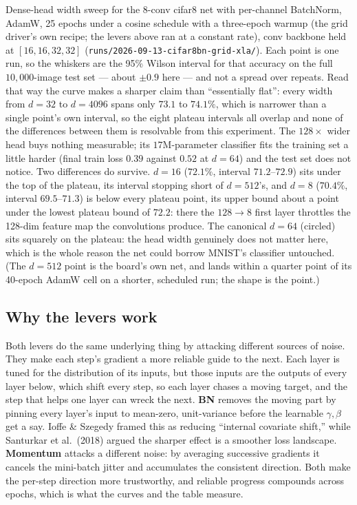 \noindent Dense-head width sweep for the 8-conv cifar8 net with per-channel
BatchNorm, AdamW, 25 epochs under a cosine schedule with a three-epoch
warmup (the grid driver's own recipe; the levers above ran at a constant
rate), conv backbone held at $[16,16,32,32]$
(\texttt{runs/2026-09-13-cifar8bn-grid-xla/}). Each point is one run, so
the whiskers are the 95\% Wilson interval for that accuracy on the full
$10{,}000$-image test set --- about $\pm 0.9$ here --- and not a spread
over repeats. Read that way the curve makes a sharper claim than
``essentially flat'': every width from $d{=}32$ to $d{=}4096$ spans only
$73.1$ to $74.1\%$, which is narrower than a single point's own interval,
so the eight plateau intervals all overlap and none of the
differences between them is resolvable from this experiment. The
$128\times$ wider head buys nothing measurable; its $17$M-parameter
classifier fits the training set a little harder (final train loss $0.39$
against $0.52$ at $d{=}64$) and the test set does not notice. Two
differences do survive. $d{=}16$ ($72.1\%$, interval $71.2$--$72.9$) sits
under the top of the plateau, its interval stopping short of $d{=}512$'s,
and $d{=}8$ ($70.4\%$, interval $69.5$--$71.3$) is below every plateau
point, its upper bound about a point under the lowest plateau bound of
$72.2$: there the $128{\to}8$ first layer throttles the 128-dim feature
map the convolutions produce. The canonical $d{=}64$ (circled) sits
squarely on the plateau: the head width genuinely does not matter here,
which is the whole reason the net could borrow MNIST's classifier
untouched. (The $d{=}512$ point is the board's own net, and lands within a
quarter point of its 40-epoch AdamW cell on a shorter, scheduled run; the
shape is the point.)

\subsection*{Why the levers work}

Both levers do the same underlying thing by attacking different sources
of noise. They make each step's gradient a more reliable guide to the
next. Each layer is tuned for the distribution of its
inputs, but those inputs are the outputs of every layer below, which
shift every step, so each layer chases a moving target, and the step
that helps one layer can wreck the next. \textbf{BN} removes the moving
part by pinning every layer's input to mean-zero, unit-variance before
the learnable $\gamma,\beta$ get a say. Ioffe \& Szegedy framed this
as reducing ``internal covariate shift,'' while Santurkar et al.\ (2018)
argued the sharper effect is a smoother loss landscape.
\textbf{Momentum} attacks a different noise: by averaging successive
gradients it cancels the mini-batch jitter and accumulates the
consistent direction. Both make the per-step direction more trustworthy,
and reliable progress compounds across epochs, which is what the
curves and the table measure.

